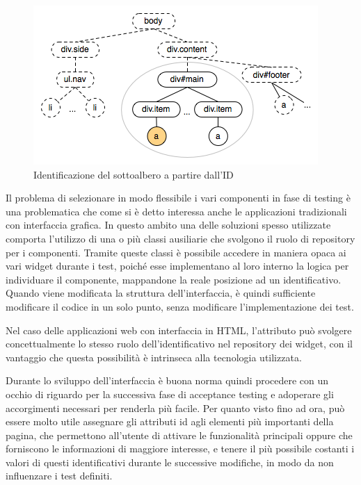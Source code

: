 \documentclass[12pt]{toptesi}
\begin{document}
\begin{figure}[htbp]
\begin{center}
\includegraphics{images/id_partition.png}
\caption{Identificazione del sottoalbero a partire dall'ID}
\label{fig:idPartition}
\end{center}
\end{figure}

Il problema di selezionare in modo flessibile i vari componenti in fase di testing è una problematica che come si è detto interessa anche le applicazioni tradizionali con interfaccia grafica. In questo ambito una delle soluzioni spesso utilizzate comporta l'utilizzo di una o più classi ausiliarie che svolgono il ruolo di repository per i componenti. Tramite queste classi è possibile accedere in maniera opaca ai vari widget durante i test, poiché esse implementano al loro interno la logica per individuare il componente, mappandone la reale posizione ad un identificativo. Quando viene modificata la struttura dell'interfaccia, è quindi sufficiente modificare il codice in un solo punto, senza modificare l'implementazione dei test.

Nel caso delle applicazioni web con interfaccia in HTML, l'attributo può svolgere concettualmente lo stesso ruolo dell'identificativo nel repository dei widget, con il vantaggio che questa possibilità è intrinseca alla tecnologia utilizzata.

Durante lo sviluppo dell'interfaccia è buona norma quindi procedere con un occhio di riguardo per la successiva fase di acceptance testing e adoperare gli accorgimenti necessari per renderla più facile. Per quanto visto fino ad ora, può essere molto utile assegnare gli attributi id agli elementi più importanti della pagina, che permettono all'utente di attivare le funzionalità principali oppure che forniscono le informazioni di maggiore interesse, e tenere il più possibile costanti i valori di questi identificativi durante le successive modifiche, in modo da non influenzare i test definiti.
\end{document}
